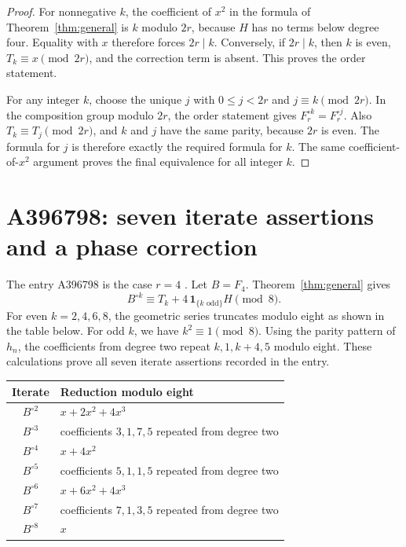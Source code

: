 \documentclass[11pt,a4paper]{article}
\theoremstyle{remark}\newtheorem{remark}[theorem]{Remark}
\begin{document}
\begin{proof}
For nonnegative $k$, the coefficient of $x^2$ in the formula of
Theorem~\ref{thm:general} is $k$ modulo $2r$, because $H$ has
no terms below degree four. Equality with $x$ therefore forces
$2r\mid k$. Conversely, if $2r\mid k$, then $k$ is even,
$T_k\equiv x\pmod{2r}$, and the correction term is absent.
This proves the order statement.

For any integer $k$, choose the unique $j$ with
$0\le j<2r$ and $j\equiv k\pmod{2r}$. In the composition group
modulo $2r$, the order statement gives
$F_r^{\circ k}=F_r^{\circ j}$. Also $T_k\equiv T_j\pmod{2r}$,
and $k$ and $j$ have the same parity, because $2r$ is even.
The formula for $j$ is therefore exactly the required formula for
$k$. The same coefficient-of-$x^2$ argument proves the final
equivalence for all integer $k$.
\end{proof}

\section{A396798: seven iterate assertions and a phase correction}

The entry A396798 is the case $r=4$ \cite{oeis}. Let $B=F_4$.
Theorem~\ref{thm:general} gives
\[
B^{\circ k}\equiv T_k+4\,\mathbf1_{\{k\text{ odd}\}}H\pmod8.
\]
For even $k=2,4,6,8$, the geometric series truncates modulo eight
as shown in the table below. For odd $k$, we have $k^2\equiv1\pmod8$.
Using the parity pattern of $h_n$, the coefficients from degree two
repeat $k,1,k+4,5$ modulo eight. These calculations prove all seven
iterate assertions recorded in the entry.

\begin{center}
\begin{tabular}{@{}cl@{}}
\toprule
Iterate & Reduction modulo eight\\
\midrule
$B^{\circ2}$ & $x+2x^2+4x^3$\\
$B^{\circ3}$ & coefficients $3,1,7,5$ repeated from degree two\\
$B^{\circ4}$ & $x+4x^2$\\
$B^{\circ5}$ & coefficients $5,1,1,5$ repeated from degree two\\
$B^{\circ6}$ & $x+6x^2+4x^3$\\
$B^{\circ7}$ & coefficients $7,1,3,5$ repeated from degree two\\
$B^{\circ8}$ & $x$\\
\bottomrule
\end{tabular}
\end{center}
\end{document}
